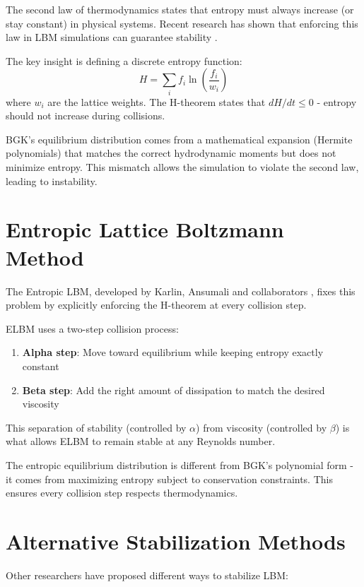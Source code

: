 The second law of thermodynamics states that entropy must always increase (or stay constant) in physical systems. Recent research has shown that enforcing this law in LBM simulations can guarantee stability \citep{karlin1999,ansumali2000}.

The key insight is defining a discrete entropy function:
\begin{equation}
H = \sum_i f_i \ln\left(\frac{f_i}{w_i}\right)
\end{equation}
where $w_i$ are the lattice weights. The H-theorem states that $dH/dt \leq 0$ - entropy should not increase during collisions.

BGK's equilibrium distribution comes from a mathematical expansion (Hermite polynomials) that matches the correct hydrodynamic moments but does not minimize entropy. This mismatch allows the simulation to violate the second law, leading to instability.

\section{Entropic Lattice Boltzmann Method}

The Entropic LBM, developed by Karlin, Ansumali and collaborators \citep{karlin1999,ansumali2000,ansumali2003}, fixes this problem by explicitly enforcing the H-theorem at every collision step.

ELBM uses a two-step collision process:
\begin{enumerate}
    \item \textbf{Alpha step}: Move toward equilibrium while keeping entropy exactly constant
    \item \textbf{Beta step}: Add the right amount of dissipation to match the desired viscosity
\end{enumerate}

This separation of stability (controlled by $\alpha$) from viscosity (controlled by $\beta$) is what allows ELBM to remain stable at any Reynolds number.

The entropic equilibrium distribution is different from BGK's polynomial form - it comes from maximizing entropy subject to conservation constraints. This ensures every collision step respects thermodynamics.

\section{Alternative Stabilization Methods}

Other researchers have proposed different ways to stabilize LBM:


